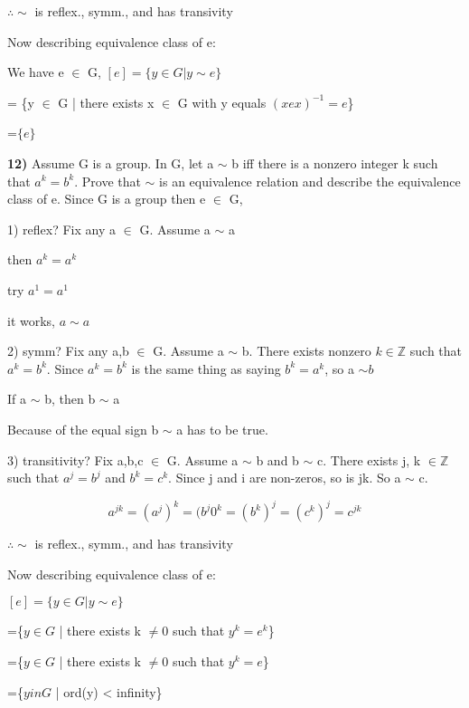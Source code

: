\documentclass{article}
\begin{document}
\medskip

$\therefore \sim$ is reflex., symm., and has transivity

\medskip

\medskip

Now describing equivalence class of e: 

\medskip

We have e $\in$ G, $[e]=\{y\in G| y \sim e\}$


\hspace{1.17in}= \{y $\in$ G | there exists x $\in$ G with y equals $(xex)^{-1}= e$\}


\hspace{1.17in}=$\{e\}$

\newpage

\textbf{12)} Assume G is a group. In G, let a $\sim$ b iff there is a nonzero
integer k such that $a^{k} = b^{k}$. 
Prove that $\sim$ is an equivalence relation and describe the equivalence class of e. Since G is a group then e $\in$ G, 

\medskip

1) reflex? Fix any a $\in$ G. Assume a $\sim$ a


then  $a^{k} = a^{k}$

try $a^{1}=a^{1}$

it works, $a \sim a$

\medskip

2) symm? Fix any a,b $\in$ G. Assume a $\sim$ b. There exists nonzero $k \in \mathbb{Z}$ such that $a^{k}=b^{k}$. Since $a^{k}=b^{k}$ is the same thing as saying $b^{k}=a^{k}$, so a $\sim b$


If a $\sim$ b, then b $\sim$ a

Because of the equal sign b $\sim$ a has to be true. 


\medskip


3) transitivity? Fix a,b,c $\in$ G. Assume a $\sim$ b and b $\sim$ c. There exists j, k $\in \mathbb{Z}$ such that $a^{j}=b^{j}$ and $b^{k}=c^{k}$. Since j and i are non-zeros, so is jk. So a $\sim$ c.

$$a^{jk}=(a^{j})^{k}=(b^{j}0^{k}=(b^{k})^{j}=(c^{k})^{j}=c^{jk}$$


\medskip

$\therefore \sim$ is reflex., symm., and has transivity

\medskip

Now describing equivalence class of e: 

\medskip


$[e]=\{y\in G | y\sim e\}$


\hspace{.17in}=\{$y \in G$ | there exists k $\neq 0$ such that $y^{k}=e^{k}$\}


\hspace{.17in}=\{$y \in G$ | there exists k $\neq 0$ such that $y^{k}=e$\}


\hspace{.17in}=\{$y in G$ | ord(y) < infinity\}





   
 
\end{document}
